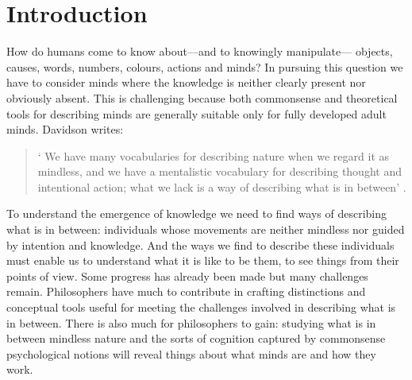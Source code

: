 \documentclass[12pt,\papersize]{extarticle}
\begin{document}
\section{Introduction}
How do humans come to know  about---and to knowingly manipulate---%
objects,
causes,
words,
numbers,
colours,
actions
and
minds?
In pursuing this question we have to consider minds where the knowledge is neither clearly present nor obviously absent. 
This is challenging because both commonsense and theoretical tools for describing minds are generally suitable only for fully developed adult minds. 
Davidson writes:
%
\begin{quote}
`%
We have many vocabularies for describing nature when we regard it as mindless, and we have a mentalistic vocabulary for describing thought and intentional action; what we lack is a way of describing what is in between' \citep[p.\ 11]{Davidson:1999ju}.
\end{quote}
%
%
To understand the emergence of knowledge we need to find ways of describing what is in between: individuals whose movements are neither mindless nor guided by intention and knowledge.  
And the ways we find to describe these individuals 
must enable us to understand what it is like to be them, to
see things from their points of view.
Some progress has already been made but many challenges remain. 
Philosophers have much to contribute in crafting distinctions and conceptual tools useful for meeting the challenges involved in describing what is in between. 
There is also much for philosophers to gain: studying what is in between mindless nature and the sorts of cognition captured by   commonsense psychological notions 
 will reveal things about what minds are and how they work.
\end{document}
